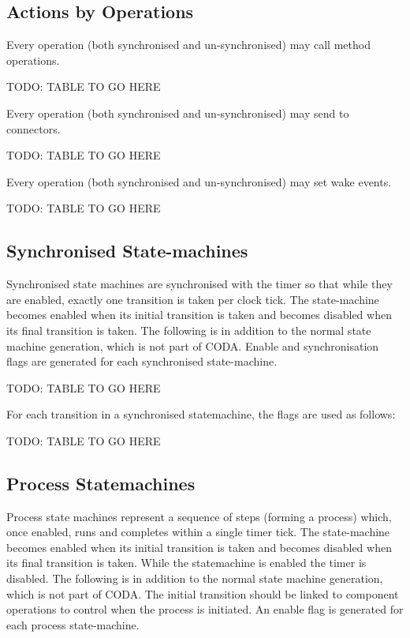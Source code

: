 \subsection{Actions by Operations}

Every operation (both synchronised and un-synchronised) may call method operations.

TODO: TABLE TO GO HERE

Every operation (both synchronised and un-synchronised) may send to connectors.

TODO: TABLE TO GO HERE


Every operation (both synchronised and un-synchronised) may set wake events.

TODO: TABLE TO GO HERE

\subsection{Synchronised State-machines}

Synchronised state machines are synchronised with the timer so that while they are enabled, exactly one transition is taken per clock tick. The state-machine becomes enabled when its initial transition is taken and becomes disabled when its final transition is taken. The following is in addition to the normal state machine generation, which is not part of CODA.
Enable and synchronisation flags are generated for each synchronised state-machine.

TODO: TABLE TO GO HERE

For each transition in a synchronised statemachine, the flags are used as follows:

TODO: TABLE TO GO HERE


\subsection{Process Statemachines}

Process state machines represent a sequence of steps (forming a process) which, once enabled, runs and completes within a single timer tick. The state-machine becomes enabled when its initial transition is taken and becomes disabled when its final transition is taken. While the statemachine is enabled the timer is disabled. The following is in addition to the normal state machine generation, which is not part of CODA. The initial transition should be linked to component operations to control when the process is initiated.
An enable flag is generated for each process state-machine. 

